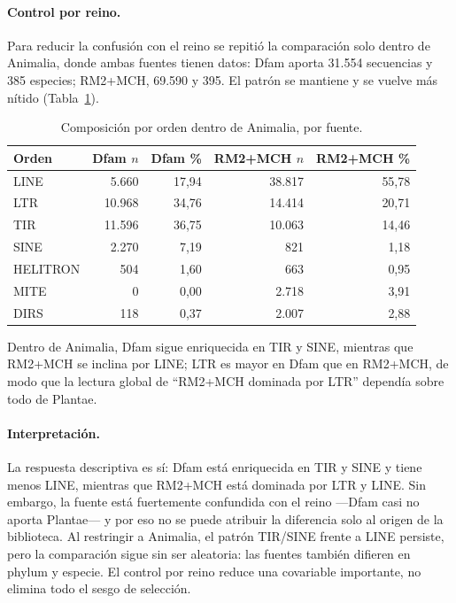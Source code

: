 \documentclass[journal]{IEEEtran}
\begin{document}
\paragraph*{Control por reino.}
Para reducir la confusión con el reino se repitió la comparación solo dentro de Animalia,
donde ambas fuentes tienen datos: Dfam aporta 31.554 secuencias y 385 especies; RM2+MCH,
69.590 y 395. El patrón se mantiene y se vuelve más nítido (Tabla~\ref{tab:dfam_animalia}).

\begin{table}[!t]
\caption{Composición por orden dentro de Animalia, por fuente.}
\label{tab:dfam_animalia}
\centering
\scriptsize
\setlength{\tabcolsep}{3pt}
\begin{tabular}{@{}lrrrr@{}}
\toprule
Orden & Dfam $n$ & Dfam \% & RM2+MCH $n$ & RM2+MCH \% \\
\midrule
LINE & 5.660 & 17,94 & 38.817 & 55,78 \\
LTR & 10.968 & 34,76 & 14.414 & 20,71 \\
TIR & 11.596 & 36,75 & 10.063 & 14,46 \\
SINE & 2.270 & 7,19 & 821 & 1,18 \\
HELITRON & 504 & 1,60 & 663 & 0,95 \\
MITE & 0 & 0,00 & 2.718 & 3,91 \\
DIRS & 118 & 0,37 & 2.007 & 2,88 \\
\bottomrule
\end{tabular}
\end{table}

Dentro de Animalia, Dfam sigue enriquecida en TIR y SINE, mientras que RM2+MCH se inclina
por LINE; LTR es mayor en Dfam que en RM2+MCH, de modo que la lectura global de ``RM2+MCH
dominada por LTR'' dependía sobre todo de Plantae.

\paragraph*{Interpretación.}
La respuesta descriptiva es sí: Dfam está enriquecida en TIR y SINE y tiene menos LINE,
mientras que RM2+MCH está dominada por LTR y LINE. Sin embargo, la fuente está fuertemente
confundida con el reino ---Dfam casi no aporta Plantae--- y por eso no se puede atribuir la
diferencia solo al origen de la biblioteca. Al restringir a Animalia, el patrón TIR/SINE
frente a LINE persiste, pero la comparación sigue sin ser aleatoria: las fuentes también
difieren en phylum y especie. El control por reino reduce una covariable importante, no
elimina todo el sesgo de selección.
\end{document}
